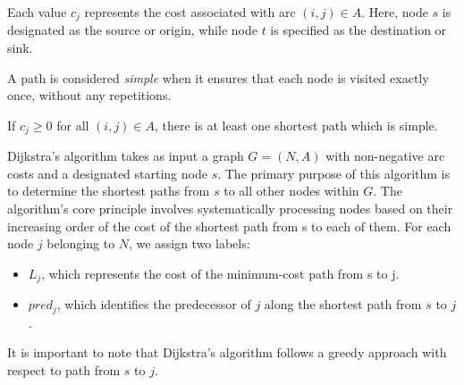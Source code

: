 \documentclass[12pt, a4paper]{report}
\begin{document}
    Each value $c_j$ represents the cost associated with arc $(i,j) \in A$. 
    Here, node $s$ is designated as the source or origin, while node $t$ is specified as the destination or sink.
    \begin{definition}
        A path is considered \emph{simple} when it ensures that each node is visited exactly once, without any repetitions.
    \end{definition}
    \begin{property}
        If $c_j \geq 0$ for all $(i,j) \in A$, there is at least one shortest path which is simple. 
    \end{property}
    Dijkstra's algorithm takes as input a graph $G = (N, A)$ with non-negative arc costs and a designated starting node $s$. 
    The primary purpose of this algorithm is to determine the shortest paths from $s$ to all other nodes within $G$.
    The algorithm's core principle involves systematically processing nodes based on their increasing order of the cost of the shortest path from s to each of them. 
    For each node $j$ belonging to $N$, we assign two labels:
    \begin{itemize}
        \item $L_j$, which represents the cost of the minimum-cost path from s to j.
        \item $pred_j$, which identifies the predecessor of $j$ along the shortest path from $s$ to $j$.
    \end{itemize} 
    It is important to note that Dijkstra's algorithm follows a greedy approach with respect to path from $s$ to $j$. 
\end{document}
